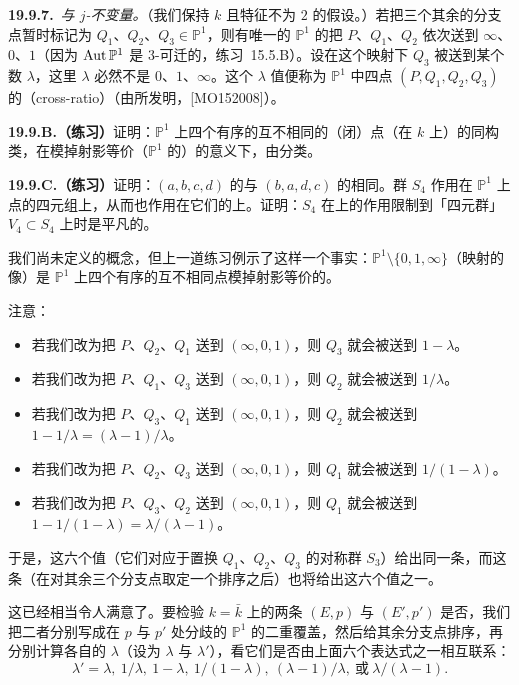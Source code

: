 \textbf{19.9.7.}\ \emph{\trCrossRatio{}与 $j$-不变量。}\quad （我们保持 $k$ \trAlgClosed{}且特征不为 $2$ 的假设。）若把三个其余的分支点暂时标记为 $Q_1$、$Q_2$、$Q_3\in\mathbb{P}^1$，则有唯一的 $\mathbb{P}^1$ 的\trAutomorphism{}把 $P$、$Q_1$、$Q_2$ 依次送到 $\infty$、$0$、$1$（因为 $\operatorname{Aut}\mathbb{P}^1$ 是 $3$-可迁的，\mbox{练习~15.5.B}）。设在这个映射下 $Q_3$ 被送到某个数 $\lambda$，这里 $\lambda$ 必然不是 $0$、$1$、$\infty$。这个 $\lambda$ 值便称为 $\mathbb{P}^1$ 中四点 $(P,Q_1,Q_2,Q_3)$ 的\textbf{\trCrossRatio}（cross-ratio）（由所发明，[MO152008]）。

\textbf{19.9.B.（练习）}\quad 证明：$\mathbb{P}^1$ 上四个有序的互不相同的（闭）点（在\trAlgClosedField{} $k$ 上）的同构类，在模掉射影等价（$\mathbb{P}^1$ 的\trAutomorphism）的意义下，由\trCrossRatio{}分类。

\textbf{19.9.C.（练习）}\quad 证明：$(a,b,c,d)$ 的\trCrossRatio{}与 $(b,a,d,c)$ 的\trCrossRatio{}相同。群 $S_4$ 作用在 $\mathbb{P}^1$ 上点的四元组上，从而也作用在它们的\trCrossRatio{}上。证明：$S_4$ 在\trCrossRatio{}上的作用限制到「\trKlein{}四元群」$V_4\subset S_4$ 上时是平凡的。

我们尚未定义\emph{\trModuliSpace}的概念，但上一道练习例示了这样一个事实：$\mathbb{P}^1\setminus\{0,1,\infty\}$（\trCrossRatio{}映射的像）是 $\mathbb{P}^1$ 上四个有序的互不相同点模掉射影等价的\trModuliSpace。

注意：
\begin{itemize}[leftmargin=2.6em,itemsep=2pt,topsep=3pt]
\item 若我们改为把 $P$、$Q_2$、$Q_1$ 送到 $(\infty,0,1)$，则 $Q_3$ 就会被送到 $1-\lambda$。
\item 若我们改为把 $P$、$Q_1$、$Q_3$ 送到 $(\infty,0,1)$，则 $Q_2$ 就会被送到 $1/\lambda$。
\item 若我们改为把 $P$、$Q_3$、$Q_1$ 送到 $(\infty,0,1)$，则 $Q_2$ 就会被送到 $1-1/\lambda=(\lambda-1)/\lambda$。
\item 若我们改为把 $P$、$Q_2$、$Q_3$ 送到 $(\infty,0,1)$，则 $Q_1$ 就会被送到 $1/(1-\lambda)$。
\item 若我们改为把 $P$、$Q_3$、$Q_2$ 送到 $(\infty,0,1)$，则 $Q_1$ 就会被送到 $1-1/(1-\lambda)=\lambda/(\lambda-1)$。
\end{itemize}

于是，这六个值（它们对应于置换 $Q_1$、$Q_2$、$Q_3$ 的对称群 $S_3$）给出同一条\trEllipticCurve，而这条\trEllipticCurve（在对其余三个分支点取定一个排序之后）也将给出这六个值之一。

这已经相当令人满意了。要检验 $k=\bar{k}$ 上的两条\trEllipticCurve{} $(E,p)$ 与 $(E',p')$ 是否\trIsomorphic，我们把二者分别写成在 $p$ 与 $p'$ 处分歧的 $\mathbb{P}^1$ 的二重覆盖，然后给其余分支点排序，再分别计算各自的 $\lambda$（设为 $\lambda$ 与 $\lambda'$），看它们是否由上面六个表达式之一相互联系：
\begin{equation*}\tag{19.9.7.1}\label{eq:cross-ratio-six-values}
\lambda'=\lambda,\ 1/\lambda,\ 1-\lambda,\ 1/(1-\lambda),\ (\lambda-1)/\lambda,\ \text{或}\ \lambda/(\lambda-1).
\end{equation*}

